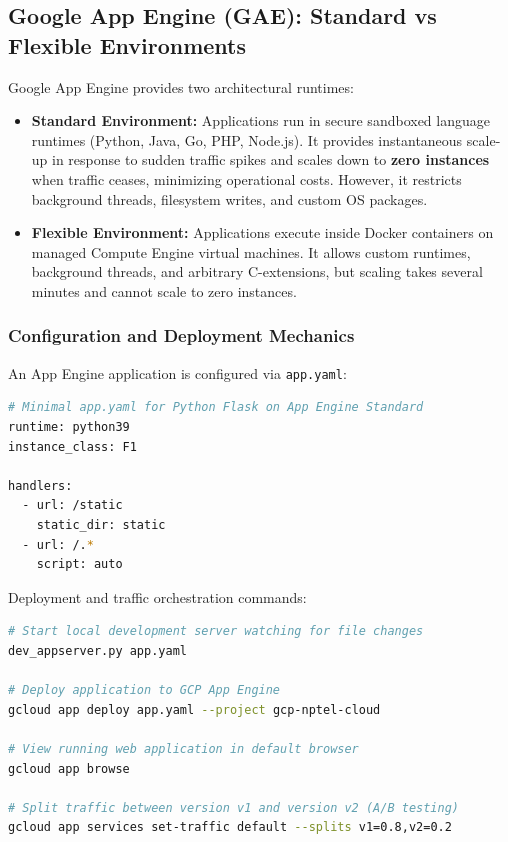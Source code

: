 \documentclass[11pt,a4paper,openany]{report}
\begin{document}
\subsection{Google App Engine (GAE): Standard vs Flexible Environments}
Google App Engine provides two architectural runtimes:
\begin{itemize}[leftmargin=*]
  \item \textbf{Standard Environment:} Applications run in secure sandboxed language runtimes (Python, Java, Go, PHP, Node.js). It provides instantaneous scale-up in response to sudden traffic spikes and scales down to \textbf{zero instances} when traffic ceases, minimizing operational costs. However, it restricts background threads, filesystem writes, and custom OS packages.
  \item \textbf{Flexible Environment:} Applications execute inside Docker containers on managed Compute Engine virtual machines. It allows custom runtimes, background threads, and arbitrary C-extensions, but scaling takes several minutes and cannot scale to zero instances.
\end{itemize}

\subsubsection{Configuration and Deployment Mechanics}
An App Engine application is configured via \texttt{app.yaml}:
\begin{lstlisting}[language=bash]
# Minimal app.yaml for Python Flask on App Engine Standard
runtime: python39
instance_class: F1

handlers:
  - url: /static
    static_dir: static
  - url: /.*
    script: auto
\end{lstlisting}

Deployment and traffic orchestration commands:
\begin{lstlisting}[language=bash]
# Start local development server watching for file changes
dev_appserver.py app.yaml

# Deploy application to GCP App Engine
gcloud app deploy app.yaml --project gcp-nptel-cloud

# View running web application in default browser
gcloud app browse

# Split traffic between version v1 and version v2 (A/B testing)
gcloud app services set-traffic default --splits v1=0.8,v2=0.2
\end{lstlisting}
\end{document}
